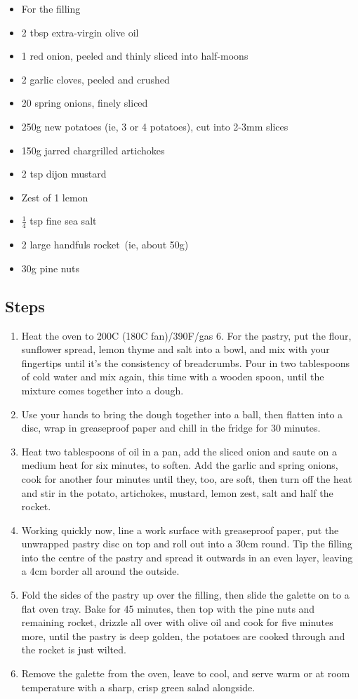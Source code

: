 \documentclass{book}
\begin{document}
\begin{itemize}
\item For the filling 
\item 2 tbsp extra-virgin olive oil
\item 1 red onion, peeled and thinly sliced into half-moons
\item 2 garlic cloves, peeled and crushed 
\item 20 spring onions, finely sliced
\item 250g new potatoes (ie, 3 or 4 potatoes), cut into 2-3mm slices
\item 150g jarred chargrilled artichokes
\item 2 tsp dijon mustard
\item Zest of 1 lemon
\item $\frac{1}{4}$ tsp fine sea salt
\item 2 large handfuls rocket (ie, about 50g)
\item 30g pine nuts
\end{itemize}

\subsection*{Steps}
\begin{enumerate}
\item Heat the oven to 200C (180C fan)/390F/gas 6. For the pastry, put the flour, sunflower spread, lemon thyme and salt into a bowl, and mix with your fingertips until it’s the consistency of breadcrumbs. Pour in two tablespoons of cold water and mix again, this time with a wooden spoon, until the mixture comes together into a dough.
\item Use your hands to bring the dough together into a ball, then flatten into a disc, wrap in greaseproof paper and chill in the fridge for 30 minutes.
\item Heat two tablespoons of oil in a pan, add the sliced onion and saute on a medium heat for six minutes, to soften. Add the garlic and spring onions, cook for another four minutes until they, too, are soft, then turn off the heat and stir in the potato, artichokes, mustard, lemon zest, salt and half the rocket. 
\item Working quickly now, line a work surface with greaseproof paper, put the unwrapped pastry disc on top and roll out into a 30cm round. Tip the filling into the centre of the pastry and spread it outwards in an even layer, leaving a 4cm border all around the outside. 
\item Fold the sides of the pastry up over the filling, then slide the galette on to a flat oven tray. Bake for 45 minutes, then top with the pine nuts and remaining rocket, drizzle all over with olive oil and cook for five minutes more, until the pastry is deep golden, the potatoes are cooked through and the rocket is just wilted. 
\item Remove the galette from the oven, leave to cool, and serve warm or at room temperature with a sharp, crisp green salad alongside.
\end{enumerate}
\newpage
\end{document}
